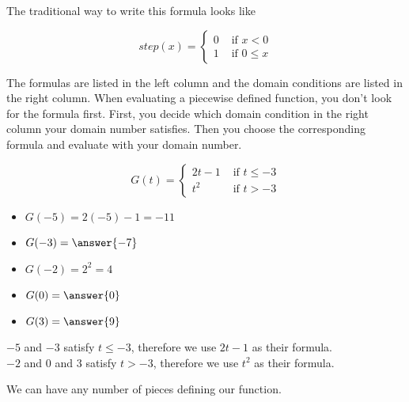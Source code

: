 \documentclass{ximera}
\begin{document}
The traditional way to write this formula looks like

\[
step(x) = 
\begin{cases}
  0 & \text{ if } x < 0 \\
  1 & \text{ if } 0 \leq x
\end{cases}
\]

The formulas are listed in the left column and the domain conditions are listed in the right column.  When evaluating a piecewise defined function, you don't look for the formula first.  First, you decide which domain condition in the right column your domain number satisfies.  Then you choose the corresponding formula and evaluate with your domain number.











\begin{example}

\[
G(t) = 
\begin{cases}
  2t-1 & \text{ if } t \leq -3 \\
  t^2 & \text{ if } t > -3
\end{cases}
\]


\begin{itemize}
\item $G(-5) = 2(-5) - 1 = -11$  
\item $G(-3) = \answer{-7}$ 
\item $G(-2) = 2^2 = 4$ 
\item $G(0) = \answer{0}$ 
\item $G(3) = \answer{9}$ 
\end{itemize}


$-5$ and $-3$ satisfy $t \leq -3$, therefore we use $2t-1$ as their formula. \\
$-2$ and $0$ and $3$ satisfy $t > -3$, therefore we use $t^2$ as their formula. \\

\end{example}


We can have any number of pieces defining our function.
\end{document}

